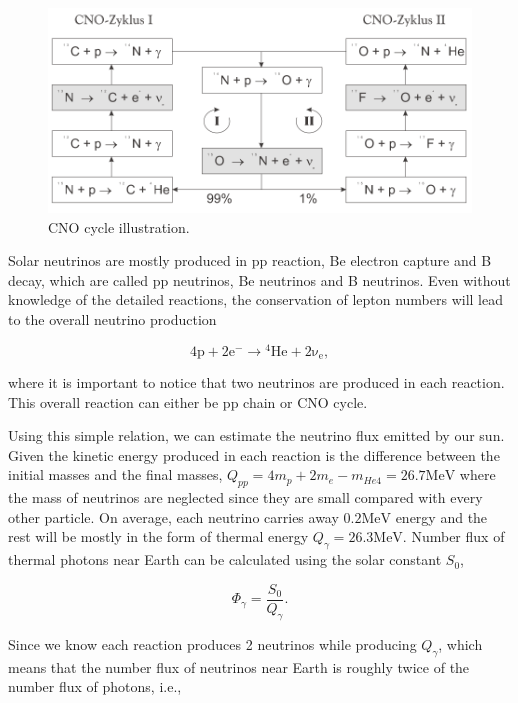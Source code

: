 \begin{figure}[!hbtp]
\centering
\includegraphics[width=\columnwidth]{chapters/assets/solar/cno_cycle.png}
\caption{CNO cycle illustration.\cite{Adelberger2011a}}
\label{fig:cno_cycle}
\end{figure}


Solar neutrinos are mostly produced in pp reaction, Be electron capture and B decay, which are called pp neutrinos, Be neutrinos and B neutrinos. Even without knowledge of the detailed reactions, the conservation of lepton numbers will lead to the overall neutrino production

\begin{equation}
\mathrm{4p+2e^- \to {}^4He + 2\nu_e },
\end{equation}

where it is important to notice that two neutrinos are produced in each reaction. This overall reaction can either be pp chain or CNO cycle.

Using this simple relation, we can estimate the neutrino flux emitted by our sun. Given the kinetic energy produced in each reaction is the difference between the initial masses and the final masses, $Q_{pp}=4m_p+2m_e-m_{He4}=26.7\mathrm{MeV}$ where the mass of neutrinos are neglected since they are small compared with every other particle. On average, each neutrino carries away $0.2\mathrm{MeV}$ energy and the rest will be mostly in the form of thermal energy $Q_\gamma=26.3\mathrm{MeV}$. Number flux of thermal photons near Earth can be calculated using the solar constant $S_0$,

\begin{equation}
\Phi_\gamma = \frac{S_0}{Q_\gamma}.
\end{equation}

Since we know each reaction produces 2 neutrinos while producing $Q_\gamma$, which means that the number flux of neutrinos near Earth is roughly twice of the number flux of photons, i.e.,

